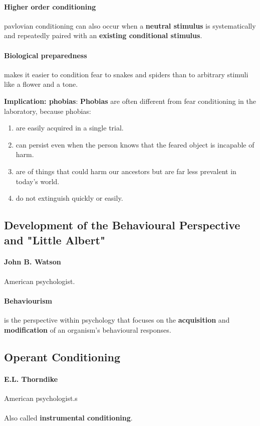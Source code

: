 \documentclass{article}
\begin{document}
	\paragraph{Higher order conditioning} pavlovian conditioning can also occur when a \textbf{neutral stimulus} is systematically and repeatedly paired with an \textbf{existing conditional stimulus}.
	\paragraph{Biological preparedness} makes it easier to condition fear to snakes and spiders than to arbitrary stimuli like a flower and a tone.
	
	\textbf{Implication: phobias}: \textbf{Phobias} are often different from fear conditioning in the laboratory, because phobias:
	\begin{enumerate}
		\item are easily acquired in a single trial.
		\item can persist even when the person knows that the feared object is incapable of harm.
		\item are of things that could harm our ancestors but are far less prevalent in today's world.
		\item do not extinguish quickly or easily.
	\end{enumerate}
	\subsection{Development of the Behavioural Perspective and "Little Albert"}
	\paragraph{John B. Watson} American psychologist.
	\paragraph{Behaviourism} is the perspective within psychology that focuses on the \textbf{acquisition} and \textbf{modification} of an organism's behavioural responses.
	\subsection{Operant Conditioning}
	\paragraph{E.L. Thorndike} American psychologist.s
	\paragraph{} Also called \textbf{instrumental conditioning}.
\end{document}
